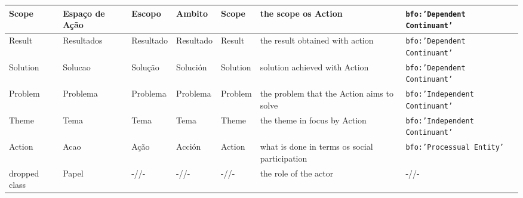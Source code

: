 \documentclass[10pt,letterpaper]{article}
\begin{document}
\begin{table}[!h]
\begin{tabular}{|p{1.8cm}|p{1.6cm}||p{2.2cm}|p{2.2cm}|p{1.8cm}||p{4cm}||p{3cm}|}
      Scope &{\bf Espa\c{c}o de A\c{c}\~ao} & Escopo & Ambito & Scope & the scope os Action & {\tt bfo:'Dependent Continuant'} \\\hline
Result & Resultados & Resultado & Resultado & Result & the result obtained with action & {\tt bfo:'Dependent Continuant'} \\\hline
      Solution & Solucao & Solu\c{c}\~ao & Soluci\'on & Solution & solution achieved with Action & {\tt bfo:'Dependent Continuant'} \\\hline \hline
      Problem & Problema & Problema & Problema & Problem & the problem that the Action aims to solve & {\tt bfo:'Independent Continuant'} \\\hline
Theme & Tema & Tema & Tema & Theme & the theme in focus by Action & {\tt bfo:'Independent Continuant'} \\\hline \hline
Action & Acao & A\c{c}\~ao & Acci\'on & Action & what is done in terms os social participation & {\tt bfo:'Processual Entity'} \\\hline\hline
      {\color{red} dropped class}& Papel & -//-  & -//- & -//- & the role of the actor & -//- \\ \hline
  \end{tabular}
  \label{ospClasses}
\end{table}
\end{document}
